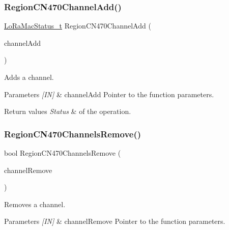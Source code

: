 \subsubsection{\texorpdfstring{Region\+C\+N470\+Channel\+Add()}{RegionCN470ChannelAdd()}}
{\footnotesize\ttfamily \hyperlink{group__LORAMAC_ga30bd25657e10480f8605ee951b0ecfbd}{Lo\+Ra\+Mac\+Status\+\_\+t} Region\+C\+N470\+Channel\+Add (\begin{DoxyParamCaption}\item[{\hyperlink{group__REGION_gab1c5f3aa06614283202906cef4417860}{Channel\+Add\+Params\+\_\+t} $\ast$}]{channel\+Add }\end{DoxyParamCaption})}



Adds a channel. 


\begin{DoxyParams}{Parameters}
{\em \mbox{[}\+I\+N\mbox{]}} & channel\+Add Pointer to the function parameters.\\
\hline
\end{DoxyParams}

\begin{DoxyRetVals}{Return values}
{\em Status} & of the operation. \\
\hline
\end{DoxyRetVals}
\mbox{\label{group__REGIONCN470_ga325aac904d27927672021106fc718f09}} 
\subsubsection{\texorpdfstring{Region\+C\+N470\+Channels\+Remove()}{RegionCN470ChannelsRemove()}}
{\footnotesize\ttfamily bool Region\+C\+N470\+Channels\+Remove (\begin{DoxyParamCaption}\item[{\hyperlink{group__REGION_gaa37468560d2fc81a977b57a48e5d72c0}{Channel\+Remove\+Params\+\_\+t} $\ast$}]{channel\+Remove }\end{DoxyParamCaption})}



Removes a channel. 


\begin{DoxyParams}{Parameters}
{\em \mbox{[}\+I\+N\mbox{]}} & channel\+Remove Pointer to the function parameters.\\
\hline
\end{DoxyParams}

